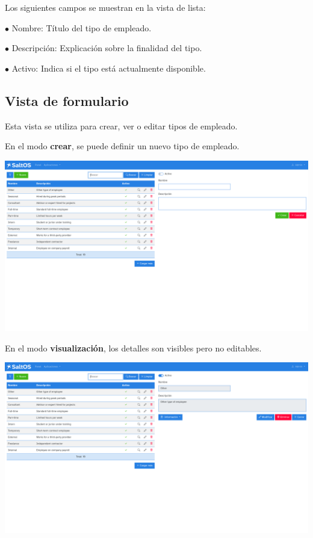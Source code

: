 \documentclass[a4paper]{article}
\begin{document}
Los siguientes campos se muestran en la vista de lista:

\begin{compactitem}
\item[\color{myblue}$\bullet$] Nombre: Título del tipo de empleado.
\item[\color{myblue}$\bullet$] Descripción: Explicación sobre la finalidad del tipo.
\item[\color{myblue}$\bullet$] Activo: Indica si el tipo está actualmente disponible.
\end{compactitem}

\hypertarget{toc114}{}
\subsection{Vista de formulario}

Esta vista se utiliza para crear, ver o editar tipos de empleado.

En el modo \textbf{crear}, se puede definir un nuevo tipo de empleado.

\begin{center}\includegraphics[width=1\textwidth]{../ujest/snaps/test-screenshots-js-screenshots-hr-employees-types-create-es-es-1-snap.png}\end{center}

En el modo \textbf{visualización}, los detalles son visibles pero no editables.

\begin{center}\includegraphics[width=1\textwidth]{../ujest/snaps/test-screenshots-js-screenshots-hr-employees-types-view-10-es-es-1-snap.png}\end{center}
\end{document}
